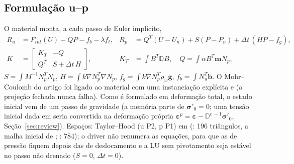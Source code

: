 \documentclass[11pt,a4paper]{article}
\newcommand{\sig}{\bm{\sigma}}
\newcommand{\eps}{\bm{\varepsilon}}
\newcommand{\D}{\mathbb{D}}
\begin{document}
\subsection{Formulação u--p}
O material  monta, a cada passo de Euler implícito,
\begin{align}
R_u &= F_{int}(U) - QP - f_b - \lambda f_t, &
R_p &= Q^T(U-U_n) + S(P-P_n) + \Delta t\,(HP-f_g),\\
K &= \begin{bmatrix} K_T & -Q\\ Q^T & S+\Delta t\,H\end{bmatrix}, &
K_T&=\int B^T\D B, \quad Q=\int\alpha B^T\mathbf m N_p,
\end{align}
$S=\int M^{-1}N_p^TN_p$, $H=\int k\nabla N_p^T\nabla N_p$, $f_g=\int k\nabla N_p^T\rho_w\mathbf g$,
$f_b=\int N_u^T\mathbf b$. O Mohr--Coulomb do artigo foi ligado ao material com uma instanciação explícita
e  (a projeção fechada nunca falha). Como  é
formulado em deformação total, o estado inicial vem de um passo de gravidade (a memória parte de
$\sig'_0=0$; uma tensão inicial dada em  seria convertida na deformação própria
$\eps^p=\eps-\D^{e\,-1}\sig'_0$, Seção~\ref{sec:review}). Espaços: Taylor--Hood (u P2, p P1) em  (: 196 triângulos, a malha
inicial de ; : 784); o driver
 não renumera as equações, para que as de pressão fiquem depois
das de deslocamento e a LU sem pivotamento seja estável no passo não drenado ($S=0$, $\Delta t=0$).
\end{document}
